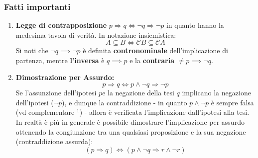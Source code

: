 \documentclass[10pt]{article}
\theoremstyle{plain}
\begin{document}
\subsubsection*{Fatti importanti}
\begin{enumerate}
    \item \textbf{Legge di contrapposizione} $p \Rightarrow q \Longleftrightarrow \neg q \Rightarrow \neg p$ in quanto hanno la medesima tavola di verità\*. In notazione insiemistica: \[A \subseteq B \Longleftrightarrow \mathcal{C}B \subseteq \mathcal{C}A\]
    Si noti che $\neg q \implies \neg p$ è definita \textbf{contronominale} dell'implicazione di partenza, mentre \textbf{l'inversa} è $q \implies p$ e la \textbf{contraria} $\neq p \implies \neg q$.
    \item \textbf{Dimostrazione per Assurdo:} \[p \Rightarrow q \Longleftrightarrow p \land \neg q \Rightarrow \neg p\] Se l'assunzione dell'ipotesi $p $e la negazione della tesi $q$ implicano la negazione dell'ipotesi ($\neg p$), e dunque la contraddizione - in quanto $p \land \neg p$ è sempre falsa (vd complementare \hyperlink{nullo}{$^1$}) - allora è verificata l'implicazione dall'ipotesi alla tesi. In realtà è più in generale è possibile dimostrare l'implicazione per assurdo ottenendo la congiunzione tra una qualsiasi proposizione e la sua negazione (contraddizione assurda): \[(p \Rightarrow q) \Longleftrightarrow (p \land \neg q \Rightarrow r \land \neg r)\]
\end{enumerate}
\end{document}
